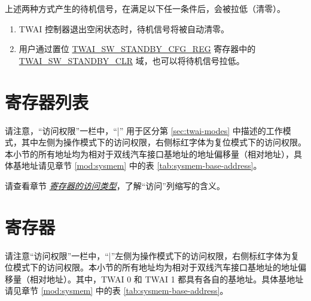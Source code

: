 \documentclass[main\_\_CN.tex]{subfiles}
\begin{document}
上述两种方式产生的待机信号，在满足以下任一条件后，会被拉低（清零）。
\begin{enumerate}
    \item TWAI 控制器退出空闲状态时，待机信号将被自动清零。
    \item 用户通过置位 \hyperref[regdesc:TWAISWSTANDBYCFGREG]{TWAI\_SW\_STANDBY\_CFG\_REG} 寄存器中的 \hyperref[fielddesc:TWAISWSTANDBYCLR]{TWAI\_SW\_STANDBY\_CLR} 域，也可以将待机信号拉低。
\end{enumerate}



\clearpage
\section{寄存器列表}
\label{sec:twai-reg-summ}
\hypertarget{twai-reg-summ}{}

请注意，“访问权限”一栏中，“|” 用于区分第 \ref{sec:twai-modes} 中描述的工作模式，其中左侧为操作模式下的访问权限，右侧标红字体为复位模式下的访问权限。本小节的所有地址均为相对于双线汽车接口基地址的地址偏移量（相对地址），具体基地址请见章节 \ref{mod:sysmem} \textit{} 中的表 \ref{tab:sysmem-base-address}。

请查看章节 \hyperref[glossary-access-types]{\textit{寄存器的访问类型}}，了解“访问”列缩写的含义。






\clearpage
\section{寄存器}

请注意“访问权限”一栏中，“|”左侧为操作模式下的访问权限，右侧标红字体为复位模式下的访问权限。本小节的所有地址均为相对于双线汽车接口基地址的地址偏移量（相对地址）。其中，TWAI 0 和 TWAI 1 都具有各自的基地址。具体基地址请见章节 \ref{mod:sysmem} \textit{} 中的表 \ref{tab:sysmem-base-address}。


\end{document}
